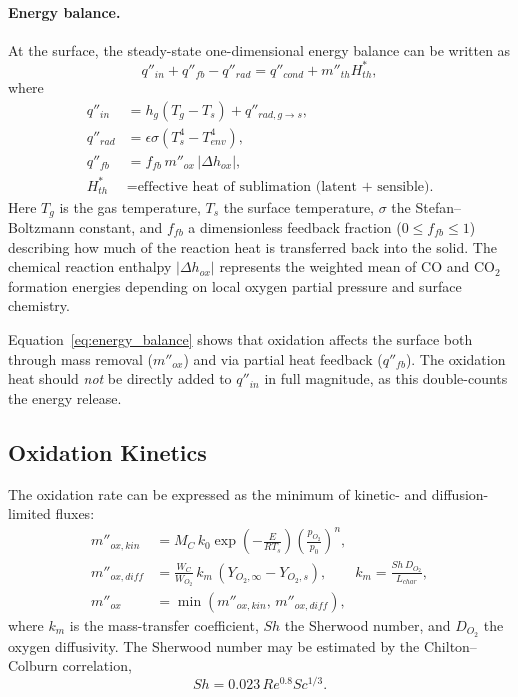 \paragraph{Energy balance.}
At the surface, the steady-state one-dimensional energy balance can be written as
\begin{equation}
q''_{in} + q''_{fb} - q''_{rad} = q''_{cond} + m''_{th} H^{*}_{th},
\label{eq:energy_balance}
\end{equation}
where
\begin{align*}
q''_{in} &= h_g (T_g - T_s) + q''_{rad,g\rightarrow s},\\
q''_{rad} &= \epsilon \sigma (T_s^4 - T_{env}^4),\\
q''_{fb} &= f_{fb}\, m''_{ox}\, |\Delta h_{ox}|,\\
H^{*}_{th} &= \text{effective heat of sublimation (latent + sensible).}
\end{align*}
Here $T_g$ is the gas temperature, $T_s$ the surface temperature, $\sigma$ the Stefan–Boltzmann constant, and $f_{fb}$ a dimensionless feedback fraction ($0 \le f_{fb} \le 1$) describing how much of the reaction heat is transferred back into the solid. The chemical reaction enthalpy $|\Delta h_{ox}|$ represents the weighted mean of CO and CO$_2$ formation energies depending on local oxygen partial pressure and surface chemistry.

Equation~\eqref{eq:energy_balance} shows that oxidation affects the surface both through mass removal ($m''_{ox}$) and via partial heat feedback ($q''_{fb}$). The oxidation heat should \emph{not} be directly added to $q''_{in}$ in full magnitude, as this double-counts the energy release.

\subsection{Oxidation Kinetics}

The oxidation rate can be expressed as the minimum of kinetic- and diffusion-limited fluxes:
\begin{align}
m''_{ox,kin} &= M_C\, k_0 \exp\!\left(-\frac{E}{R T_s}\right)
\left(\frac{p_{O_2}}{p_0}\right)^n,\\[4pt]
m''_{ox,diff} &= \frac{W_C}{W_{O_2}}\, k_m\,(Y_{O_2,\infty} - Y_{O_2,s}),
\qquad
k_m = \frac{Sh\,D_{O_2}}{L_{char}},\\[4pt]
m''_{ox} &= \min(m''_{ox,kin},\, m''_{ox,diff}),
\end{align}
where $k_m$ is the mass-transfer coefficient, $Sh$ the Sherwood number, and $D_{O_2}$ the oxygen diffusivity. The Sherwood number may be estimated by the Chilton–Colburn correlation,
\[
Sh = 0.023\,Re^{0.8}Sc^{1/3}.
\]

